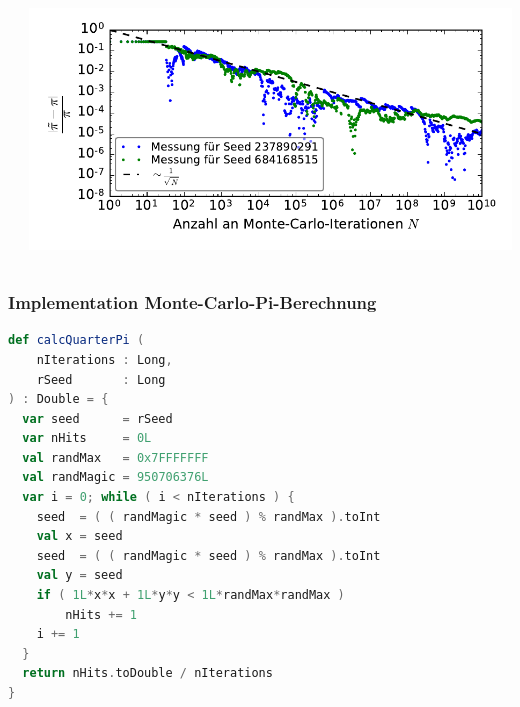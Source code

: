 \begin{frame}
\begin{columns}
\begin{column}{0.35\linewidth}
    \end{column}\begin{column}{0.65\linewidth}
        \centerline{\includegraphics[width=1.1\linewidth]{monte-carlo-pi-error-scaling.pdf}}
    \end{column}\end{columns}
\end{frame}

\begin{frame}[fragile]
    \frametitle{Implementation Monte-Carlo-Pi-Berechnung}
    \begin{lstlisting}[language=scala]
def calcQuarterPi (
    nIterations : Long,
    rSeed       : Long
) : Double = {
  var seed      = rSeed
  var nHits     = 0L
  val randMax   = 0x7FFFFFFF
  val randMagic = 950706376L
  var i = 0; while ( i < nIterations ) {
    seed  = ( ( randMagic * seed ) % randMax ).toInt
    val x = seed
    seed  = ( ( randMagic * seed ) % randMax ).toInt
    val y = seed
    if ( 1L*x*x + 1L*y*y < 1L*randMax*randMax )
        nHits += 1
    i += 1
  }
  return nHits.toDouble / nIterations
}
\end{lstlisting}
\end{frame}

